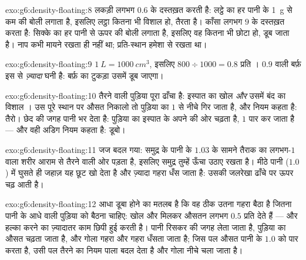 \begin{solution}{exo:g6:density-floating:8}
लकड़ी लगभग $0.6$ के दस्तख़त करती है: लट्ठे का हर  पानी के
\qty{1}{g} से कम की बोली लगाता है, इसलिए लट्ठा कितना भी विशाल हो,
तैरता है। काँसा लगभग $9$ के दस्तख़त करता है: सिक्के का हर 
पानी से ऊपर की बोली लगाता है, इसलिए वह कितना भी छोटा हो, डूब जाता है।
नाप कभी मायने रखता ही नहीं था; प्रति-स्थान  हमेशा से रखता
था।
\end{solution}

\begin{solution}{exo:g6:density-floating:9}
$\qty{1}{L} = \qty{1000}{cm^3}$, इसलिए $800 \div 1000 = 0.8$ 
प्रति । $0.9$ वाली बर्फ़ इस  से \emph{ज़्यादा} घनी है:
बर्फ़ का टुकड़ा उसमें डूब जाएगा।
\end{solution}

\begin{solution}{exo:g6:density-floating:10}
तैरने वाली पुड़िया पूरा ढाँचा है: इस्पात का खोल \emph{और} उसमें बंद
 का विशाल । उस पूरे स्थान पर औसत निकालो तो पुड़िया का  $1$
से नीचे गिर जाता है, और नियम कहता है: तैरो। छेद  की जगह पानी भर
देता है: पुड़िया का  इस्पात के अपने  की ओर चढ़ता है, $1$ पार
कर जाता है --- और वही अडिग नियम कहता है: डूबो।
\end{solution}

\begin{solution}{exo:g6:density-floating:11}
जज बदल गया: समुद्र के पानी के $1.03$ के सामने तैराक का लगभग-$1$ वाला
शरीर आराम से तैरने वाली ओर पड़ता है, इसलिए समुद्र तुम्हें ऊँचा उठाए
रखता है। मीठे पानी ($1.0$) में घुसते ही जहाज़ यह छूट खो देता है और
ज़्यादा गहरा धँस जाता है: उसकी जलरेखा ढाँचे पर ऊपर चढ़ आती है।
\end{solution}

\begin{solution}{exo:g6:density-floating:12}
आधा डूबा होने का मतलब है कि वह ठीक उतना गहरा बैठा है जितना पानी के आधे
 वाली पुड़िया को बैठना चाहिए: खोल और  मिलकर औसतन लगभग $0.5$
 प्रति  देते हैं --- और हल्का करने का ज़्यादातर काम
छिपी हुई  करती है। पानी रिसकर  की जगह लेता जाता है, पुड़िया का
औसत  चढ़ता जाता है, और गोला गहरा और गहरा धँसता जाता है; जिस पल
औसत पानी के $1.0$ को पार करता है, उसी पल तैरने का नियम पाला बदल देता
है और गोला नीचे चला जाता है।
\end{solution}

